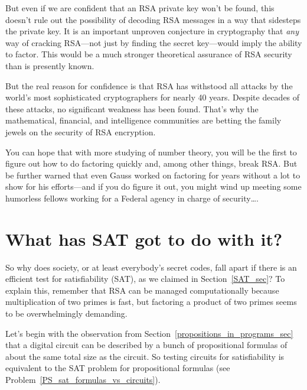 But even if we are confident that an RSA private key won't be found,
this doesn't rule out the possibility of decoding RSA messages in a
way that sidesteps the private key.  It is an important unproven
conjecture in cryptography that \emph{any} way of cracking RSA---not
just by finding the secret key---would imply the ability to factor.
This would be a much stronger theoretical assurance of RSA security
than is presently known.

But the real reason for confidence is that RSA has withstood all
attacks by the world's most sophisticated cryptographers for nearly 40
years.  Despite decades of these attacks, no significant weakness has
been found.  That's why the mathematical, financial, and intelligence
communities are betting the family jewels on the security of RSA
encryption.

You can hope that with more studying of number theory, you will be the
first to figure out how to do factoring quickly and, among other
things, break RSA.  But be further warned that even Gauss worked on
factoring for years without a lot to show for his efforts---and if you
do figure it out, you might wind up meeting some humorless fellows
working for a Federal agency in charge of security\dots.

\begin{problems}
\practiceproblems
{}

\classproblems
{}

\homeworkproblems
{}
\end{problems}

\section{What has SAT got to do with it?}\label{SAT_RSA_sec}
So why does society, or at least everybody's secret codes, fall apart
if there is an efficient test for satisfiability (SAT), as we claimed
in Section~\ref{SAT_sec}?  To explain this, remember that RSA can be
managed computationally because multiplication of two primes is fast,
but factoring a product of two primes seems to be overwhelmingly
demanding.

Let's begin with the observation from
Section~\ref{propositions_in_programs_sec} that a digital circuit can
be described by a bunch of propositional formulas of about the same
total size as the circuit.  So testing circuits for satisfiability is
equivalent to the SAT problem for propositional formulas (see
Problem~\ref{PS_sat_formulas_vs_circuits}).

